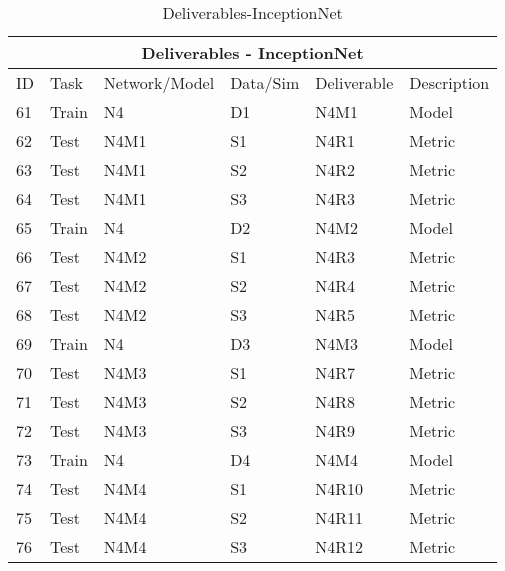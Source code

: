 \documentclass{article}
\begin{document}
\begin{table}[]
\begin{center}
\begin{tabular}{|l|l|l|l|l|l|}
\hline
\multicolumn{6}{|c|}{Deliverables - InceptionNet} \\ \hline

ID & Task &  Network/Model & Data/Sim & Deliverable & Description \\ \hline\hline
61 & Train & N4 & D1 & N4M1 & Model \\ \hline
62 & Test & N4M1 & S1 & N4R1 & Metric \\ \hline
63 & Test & N4M1 & S2 & N4R2 & Metric \\ \hline
64 & Test & N4M1 & S3 & N4R3 & Metric \\ \hline\hline

65 & Train & N4 & D2 & N4M2 & Model \\ \hline
66 & Test & N4M2 & S1 & N4R3 & Metric \\ \hline
67 & Test & N4M2 & S2 & N4R4 & Metric \\ \hline
68 & Test & N4M2 & S3 & N4R5 & Metric \\ \hline\hline

69 & Train & N4 & D3 & N4M3 & Model \\ \hline
70 & Test & N4M3 & S1 & N4R7 & Metric \\ \hline
71 & Test & N4M3 & S2 & N4R8 & Metric \\ \hline
72 & Test & N4M3 & S3 & N4R9 & Metric \\ \hline\hline

73 & Train & N4 & D4 & N4M4 & Model \\ \hline
74 & Test & N4M4 & S1 & N4R10 & Metric \\ \hline
75 & Test & N4M4 & S2 & N4R11 & Metric \\ \hline
76 & Test & N4M4 & S3 & N4R12 & Metric \\ \hline 

\end{tabular}
\end{center}
\caption{Deliverables-InceptionNet}
\label{Deliverables-InceptionNet}
\end{table}


\end{document}
